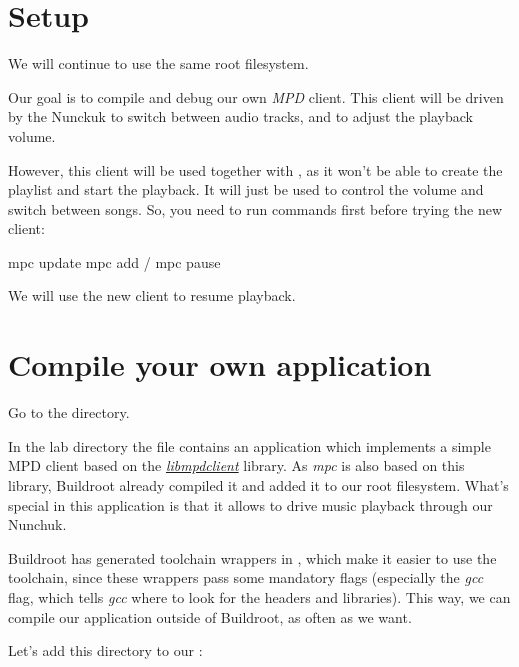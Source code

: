 
\section{Setup}

We will continue to use the same root filesystem.

Our goal is to compile and debug our own {\em MPD} client. This client
will be driven by the Nunckuk to switch between audio tracks, and to
adjust the playback volume.

However, this client will be used together with , as it won't
be able to create the playlist and start the playback. It will just be
used to control the volume and switch between songs. So, you need to
run  commands first before trying the new client:

\begin{bashinput}
mpc update
mpc add /
mpc pause
\end{bashinput}

We will use the new client to resume playback.

\section{Compile your own application}

Go to the  directory.

In the lab directory the file  contains an
application which implements a simple MPD client based on the
{\em \href{https://musicpd.org/libs/libmpdclient/}{libmpdclient}} library.
As {\em mpc} is also based on this library, Buildroot already compiled
it and added it to our root filesystem. What's special in this
application is that it allows to drive music playback through our
Nunchuk.

Buildroot has generated toolchain wrappers in
, which make it easier to use the toolchain,
since these wrappers pass some mandatory flags (especially the
 {\em gcc} flag, which tells {\em gcc} where to look
for the headers and libraries). This way, we can compile our application
outside of Buildroot, as often as we want.

Let's add this directory to our :

\small
{}
\normalsize

